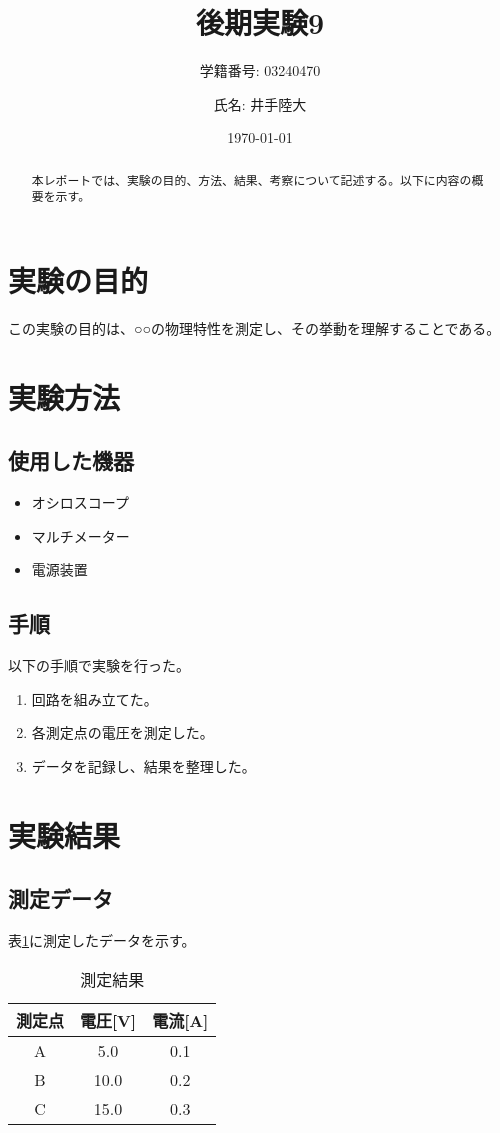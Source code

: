 \documentclass[a4paper, twocolumn]{article} %
\title{後期実験9}
\author{学籍番号: 03240470 \and 氏名: 井手陸大}
\date{\today}
\begin{document}
\maketitle
\begin{abstract}
本レポートでは、実験の目的、方法、結果、考察について記述する。以下に内容の概要を示す。
\end{abstract}

\section{実験の目的}
この実験の目的は、○○の物理特性を測定し、その挙動を理解することである。

\section{実験方法}
\subsection{使用した機器}
\begin{itemize}
    \item オシロスコープ
    \item マルチメーター
    \item 電源装置
\end{itemize}

\subsection{手順}
以下の手順で実験を行った。
\begin{enumerate}
    \item 回路を組み立てた。
    \item 各測定点の電圧を測定した。
    \item データを記録し、結果を整理した。
\end{enumerate}

\section{実験結果}
\subsection{測定データ}
表\ref{tab:results}に測定したデータを示す。

\begin{table}[H]
    \centering
    \caption{測定結果}
    \label{tab:results}
    \begin{tabular}{|c|c|c|}
        \hline
        測定点 & 電圧[V] & 電流[A] \\
        \hline
        A      & 5.0     & 0.1     \\
        B      & 10.0    & 0.2     \\
        C      & 15.0    & 0.3     \\
        \hline
    \end{tabular}
\end{table}
\end{document}
